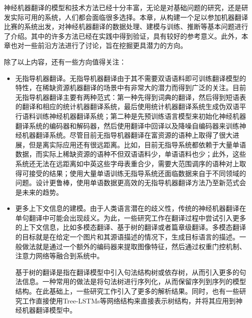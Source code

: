 \parinterval 神经机器翻译的模型和技术方法已经十分丰富，无论是对基础问题的研究，还是研发实际可用的系统，人们都会面临很多选择。本章，从构建一个足以参加机器翻译比赛的系统出发，对神经机器翻译的数据处理、建模与训练、推断等基本问题进行了介绍。其中的许多方法已经在实践中得到验证，具有较好的参考意义。此外，本章也对一些前沿方法进行了讨论，旨在挖掘更具潜力的方向。

\parinterval 除了以上内容，还有一些方向值得关注：

\begin{itemize}
\vspace{0.5em}
\item 无指导机器翻译。无指导机器翻译由于其不需要双语语料即可训练翻译模型的特性，在稀缺资源机器翻译的场景中有非常大的潜力而得到广泛的关注。目前无指导机器翻译主要有两种范式：第一种先得到词典的翻译，然后得到短语表的翻译和相应的统计机器翻译系统，最后使用统计机器翻译系统生成伪双语平行语料训练神经机器翻译系统\cite{DBLP:conf/acl/ArtetxeLA19}；第二种是先预训练语言模型来初始化神经机器翻译系统的编码器和解码器，然后使用翻译中回译以及降噪自编码器来训练神经机器翻译系统\cite{lample2019cross}。尽管目前无指导机器翻译在富资源的语种上取得了很大进展，但是离实际应用还有很远距离。比如，目前无指导系统都依赖于大量单语数据，而实际上稀缺资源的语种不但双语语料少，单语语料也少；此外，这些系统还无法在远距离如中英这些字母表重合少，需要大范围调序的语种对上取得可接受的结果；使用大量单语训练无指导系统还面临数据来自于不同领域的问题\cite{DBLP:journals/corr/abs-2004-05516}。设计更鲁棒，使用单语数据更高效的无指导机器翻译方法乃至新范式会是未来的趋势。
\vspace{0.5em}
\item 更多上下文信息的建模。由于人类语言潜在的歧义性，传统的神经机器翻译在单句翻译中可能会出现歧义。为此，一些研究工作在翻译过程中尝试引入更多的上下文信息，比如多模态翻译、基于树的翻译或者篇章级翻译。多模态翻译的目标就是在给定一个图片和其源语描述的情况下，生成目标语言的描述。一般做法就是通过一个额外的编码器来提取图像特征\cite{DBLP:journals/corr/ElliottFH15,DBLP:conf/acl/HitschlerSR16}，然后通过权重门控机制、注意力网络等融合到系统中\cite{DBLP:conf/wmt/HuangLSOD16}。

\parinterval 基于树的翻译是指在翻译模型中引入句法结构树或依存树，从而引入更多的句法信息。一种常用的做法是将句法树进行序列化，从而保留序列到序列的模型结构\cite{DBLP:conf/emnlp/CurreyH18,DBLP:conf/acl/SaundersSGB18}。在此基础上，一些研究工作引入了更多的解析结果\cite{DBLP:conf/acl/SumitaUZTM18,DBLP:conf/coling/ZaremoodiH18}。同时，也有一些研究工作直接使用Tree-LSTMs等网络结构\cite{DBLP:conf/acl/TaiSM15,DBLP:conf/iclr/ShenTSC19}来直接表示树结构，并将其应用到神经机器翻译模型中\cite{DBLP:conf/acl/EriguchiHT16,Yang2017TowardsBH,DBLP:conf/acl/ChenHCC17}。


\end{itemize}
